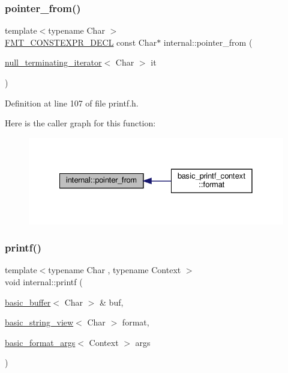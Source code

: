 \subsubsection{\texorpdfstring{pointer\+\_\+from()}{pointer\_from()}\hspace{0.1cm}{\footnotesize\ttfamily [3/3]}}
{\footnotesize\ttfamily template$<$typename Char $>$ \\
\hyperlink{core_8h_af4388801466a5994a363d6005616371a}{F\+M\+T\+\_\+\+C\+O\+N\+S\+T\+E\+X\+P\+R\+\_\+\+D\+E\+CL} const Char$\ast$ internal\+::pointer\+\_\+from (\begin{DoxyParamCaption}\item[{\hyperlink{classinternal_1_1null__terminating__iterator}{null\+\_\+terminating\+\_\+iterator}$<$ Char $>$}]{it }\end{DoxyParamCaption})}



Definition at line 107 of file printf.\+h.

Here is the caller graph for this function\+:
\nopagebreak
\begin{figure}[H]
\begin{center}
\leavevmode
\includegraphics[width=328pt]{namespaceinternal_a1c1f62847a38000abb38914d5a42ae9f_icgraph}
\end{center}
\end{figure}
\mbox{\label{namespaceinternal_adb04322abcec003865318281a6952434}} 
\subsubsection{\texorpdfstring{printf()}{printf()}}
{\footnotesize\ttfamily template$<$typename Char , typename Context $>$ \\
void internal\+::printf (\begin{DoxyParamCaption}\item[{\hyperlink{classinternal_1_1basic__buffer}{basic\+\_\+buffer}$<$ Char $>$ \&}]{buf,  }\item[{\hyperlink{classbasic__string__view}{basic\+\_\+string\+\_\+view}$<$ Char $>$}]{format,  }\item[{\hyperlink{classbasic__format__args}{basic\+\_\+format\+\_\+args}$<$ Context $>$}]{args }\end{DoxyParamCaption})}



